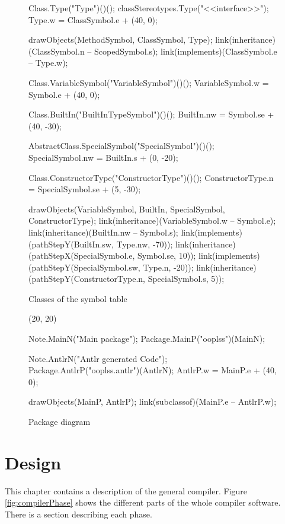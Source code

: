 \begin{figure}[H]
\begin{emp}[classdiag]
	Class.Type("Type")()();
	classStereotypes.Type("<<interface>>");
	Type.w = ClassSymbol.e + (40, 0);

	drawObjects(MethodSymbol, ClassSymbol, Type);
	link(inheritance)(ClassSymbol.n -- ScopedSymbol.s);
	link(implements)(ClassSymbol.e -- Type.w);


	Class.VariableSymbol("VariableSymbol")()();
	VariableSymbol.w = Symbol.e + (40, 0);

	Class.BuiltIn("BuiltInTypeSymbol")()();
	BuiltIn.nw = Symbol.se + (40, -30);

	AbstractClass.SpecialSymbol("SpecialSymbol")()();
	SpecialSymbol.nw = BuiltIn.s + (0, -20);

	Class.ConstructorType("ConstructorType")()();
	ConstructorType.n = SpecialSymbol.se + (5, -30);

	drawObjects(VariableSymbol, BuiltIn, SpecialSymbol, ConstructorType);
	link(inheritance)(VariableSymbol.w -- Symbol.e);
	link(inheritance)(BuiltIn.nw -- Symbol.s);
	link(implements)(pathStepY(BuiltIn.sw, Type.nw, -70));
	link(inheritance)(pathStepX(SpecialSymbol.e, Symbol.se, 10));
	link(implements)(pathStepY(SpecialSymbol.sw, Type.n, -20));
	link(inheritance)(pathStepY(ConstructorType.n, SpecialSymbol.s, 5));





	\end{emp}
	\caption{Classes of the symbol table}
	\label{fig:classes}
\end{figure}


\begin{figure}[H]
\centering
	\begin{emp}[classdiag](20, 20)

	Note.MainN("Main package");
	Package.MainP("ooplss")(MainN);

	Note.AntlrN("Antlr generated Code");
	Package.AntlrP("ooplss.antlr")(AntlrN);
	AntlrP.w = MainP.e + (40, 0);

	drawObjects(MainP, AntlrP);
	link(subclassof)(MainP.e -- AntlrP.w);

	\end{emp}
	\caption{Package diagram}
	\label{fig:classes}
\end{figure}

\section{Design}
This chapter contains a description of the general compiler. Figure
\ref{fig:compilerPhase} shows the different parts of the whole compiler
software. There is a section describing each phase.


